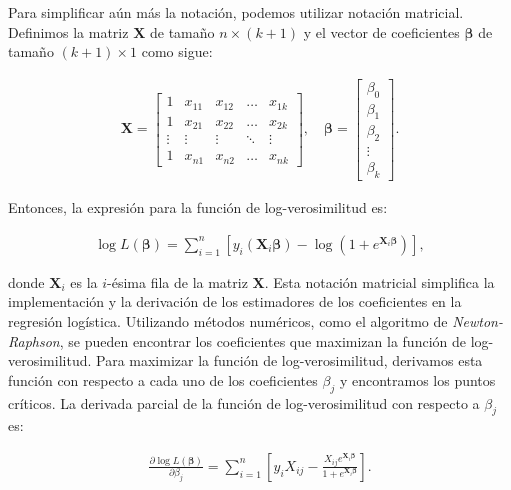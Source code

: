 \documentclass[12pt]{article}
\begin{document}
Para simplificar aún más la notación, podemos utilizar notación matricial. Definimos la matriz $\mathbf{X}$ de tamaño $n \times (k+1)$ y el vector de coeficientes $\boldsymbol{\beta}$ de tamaño $(k+1) \times 1$ como sigue:

\begin{eqnarray*}%
\mathbf{X} = \begin{bmatrix}
1 & x_{11} & x_{12} & \ldots & x_{1k} \\
1 & x_{21} & x_{22} & \ldots & x_{2k} \\
\vdots & \vdots & \vdots & \ddots & \vdots \\
1 & x_{n1} & x_{n2} & \ldots & x_{nk}
\end{bmatrix}, \quad
\boldsymbol{\beta} = \begin{bmatrix}
\beta_0 \\
\beta_1 \\
\beta_2 \\
\vdots \\
\beta_k
\end{bmatrix}.
\end{eqnarray*}

Entonces, la expresión para la función de log-verosimilitud es:

\begin{eqnarray*}%
\log L(\boldsymbol{\beta}) = \sum_{i=1}^{n} \left[ y_i (\mathbf{X}_i \boldsymbol{\beta}) - \log(1 + e^{\mathbf{X}_i \boldsymbol{\beta}}) \right],
\end{eqnarray*}

donde $\mathbf{X}_i$ es la $i$-ésima fila de la matriz $\mathbf{X}$.  Esta notación matricial simplifica la implementación y la derivación de los estimadores de los coeficientes en la regresión logística. Utilizando métodos numéricos, como el algoritmo de \textit{Newton-Raphson}, se pueden encontrar los coeficientes que maximizan la función de log-verosimilitud. Para maximizar la función de log-verosimilitud, derivamos esta función con respecto a cada uno de los coeficientes $\beta_j$ y encontramos los puntos críticos. La derivada parcial de la función de log-verosimilitud con respecto a $\beta_j$ es:

\begin{eqnarray}\label{Eq.1.14}
\frac{\partial \log L(\boldsymbol{\beta})}{\partial \beta_j} = \sum_{i=1}^{n} \left[ y_i X_{ij} - \frac{X_{ij} e^{\mathbf{X}_i \boldsymbol{\beta}}}{1 + e^{\mathbf{X}_i \boldsymbol{\beta}}} \right].
\end{eqnarray}
\end{document}
